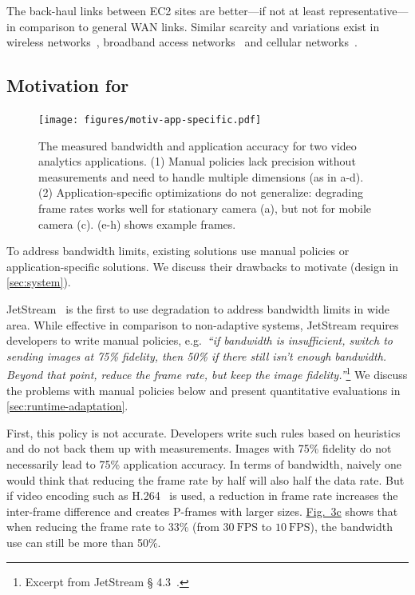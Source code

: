 The back-haul links between EC2 sites are better---if not at least
representative---in comparison to general WAN links. Similar scarcity and
variations exist in wireless networks~\cite{biswas2015large}, broadband access
networks~\cite{grover2013peeking, sundaresan2014bismark} and cellular
networks~\cite{nikravesh2014mobile}.

\subsection{Motivation for \sysname{}}
\label{subsec:motivation}

\begin{figure}
  \centering
  \texttt{[image: figures/motiv-app-specific.pdf]}
  \caption{The measured bandwidth and application accuracy for two video
    analytics applications. (1) Manual policies lack precision without
    measurements and need to handle multiple dimensions (as in a-d). (2)
    Application-specific optimizations do not generalize: degrading frame rates
    works well for stationary camera (a), but not for mobile camera (c). (e-h)
    shows example frames.}
  \label{fig:app-specific}
\end{figure}

To address bandwidth limits, existing solutions use manual policies or
application-specific solutions. We discuss their drawbacks to motivate
\sysname{} (design in \autoref{sec:system}).

 JetStream~\cite{rabkin2014aggregation} is
the first to use degradation to address bandwidth limits in wide area. While
effective in comparison to non-adaptive systems, JetStream requires developers
to write manual policies, e.g.~\textit{``if bandwidth is insufficient, switch to
  sending images at 75\% fidelity, then 50\% if there still isn't enough
  bandwidth. Beyond that point, reduce the frame rate, but keep the image
  fidelity.''}\footnote{Excerpt from JetStream \S
  4.3~\cite{rabkin2014aggregation}.} We discuss the problems with manual
policies below and present quantitative evaluations in
\autoref{sec:runtime-adaptation}.

First, this policy is not accurate.  Developers write such rules based on
heuristics and do not back them up with measurements. Images with 75\% fidelity
do not necessarily lead to 75\% application accuracy. In terms of bandwidth,
naively one would think that reducing the frame rate by half will also half the
data rate. But if video encoding such as H.264~\cite{richardson2011h} is used, a
reduction in frame rate increases the inter-frame difference and creates
P-frames with larger sizes. \hyperref[fig:app-specific]{Fig.~3c} shows that when
reducing the frame rate to 33\% (from \(30~\text{FPS}\) to \(10~\text{FPS}\)),
the bandwidth use can still be more than 50\%.

